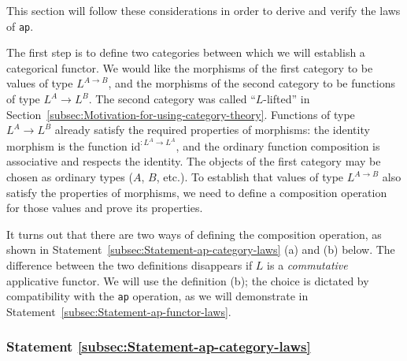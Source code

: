 This section will follow these considerations in order to derive and
verify the laws of \lstinline!ap!.

The first step is to define two categories between which we will establish
a categorical functor. We would like the morphisms of the first category
to be values of type $L^{A\rightarrow B}$, and the morphisms of the
second category to be functions of type $L^{A}\rightarrow L^{B}$.
The second category was called \textsf{``}$L$-lifted\textsf{''} in Section~\ref{subsec:Motivation-for-using-category-theory}.
Functions of type $L^{A}\rightarrow L^{B}$ already satisfy the required
properties of morphisms: the identity morphism is the function $\text{id}^{:L^{A}\rightarrow L^{A}}$,
and the ordinary function composition is associative and respects
the identity. The objects of the first category may be chosen as ordinary
types ($A$, $B$, etc.). To establish that values of type $L^{A\rightarrow B}$
also satisfy the properties of morphisms, we need to define a composition
operation for those values and prove its properties.

It turns out that there are two ways of defining the composition operation,
as shown in Statement~\ref{subsec:Statement-ap-category-laws} (a)
and (b) below. The difference between the two definitions disappears
if $L$ is a \emph{commutative} applicative functor. We will use the
definition (b); the choice is dictated by compatibility with the \lstinline!ap!
operation, as we will demonstrate in Statement~\ref{subsec:Statement-ap-functor-laws}.

\subsubsection{Statement \label{subsec:Statement-ap-category-laws}\ref{subsec:Statement-ap-category-laws}}

